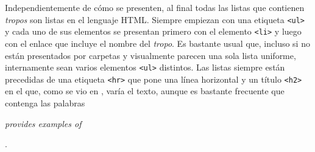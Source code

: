 Independientemente de cómo se presenten, al final todas las listas que contienen
\textit{tropos} son listas en el lenguaje HTML. Siempre empiezan con una
etiqueta \texttt{<ul>} y cada uno de sus elementos se presentan primero con el
elemento \texttt{<li>} y luego con el enlace que incluye el nombre del
\textit{tropo}. Es bastante usual que, incluso si no están presentados por
carpetas y visualmente parecen una sola lista uniforme, internamente sean varios
elementos \texttt{<ul>} distintos. Las listas siempre están precedidas de una
etiqueta \texttt{<hr>} que pone una línea horizontal y un título \texttt{<h2>}
en el que, como se vio en \cite{nishalscraping}, varía el texto, aunque es
bastante frecuente que contenga las palabras
\begin{otherlanguage}{english}\textit{provides examples of}\end{otherlanguage}.

